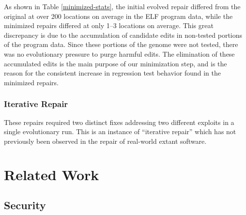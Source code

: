 \documentclass{sigcomm-alternate}
\begin{document}
{As shown in Table \ref{minimized-stats}, the initial evolved repair
differed from the original at over 200 locations on average in the ELF
program data, while the minimized repairs differed at only 1--3
locations on average.  This great discrepancy is due to the
accumulation of candidate edits in non-tested portions of the program
data.  Since these portions of the genome were not tested, there was
no evolutionary pressure to purge harmful edits.  The elimination of
these accumulated edits is the main purpose of our minimization step,
and is the reason for the consistent increase in regression test
behavior found in the minimized repairs.

\subsubsection{Iterative Repair}
\label{iterative-repair}
These repairs required two distinct fixes addressing two different
exploits in a single evolutionary run.  This is an instance of
``iterative repair'' which has not previously been observed in the
repair of real-world extant software.


\section{Related Work}
\label{sec-5}
\subsection{Security}
\label{sec-5-1}

}
\end{document}

